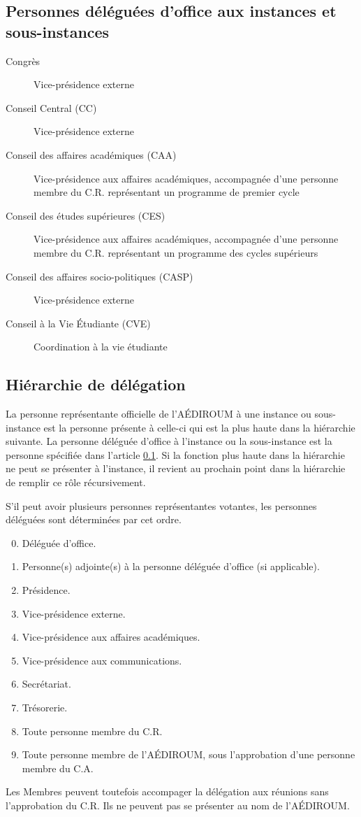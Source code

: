 \documentclass{aediroum}
\newcommand{\article}[1]{article \ref{#1}}
\begin{document}
\subsection{Personnes déléguées d’office aux instances et sous-instances}\label{sec:delegues-doffice-instances}
\begin{description}
\item[Congrès] Vice-présidence externe
\item[Conseil Central (CC)] Vice-présidence externe
\item[Conseil des affaires académiques (CAA)] Vice-présidence aux affaires académiques, accompagnée d’une personne membre du C.R. représentant
un programme de premier cycle
\item[Conseil des études supérieures (CES)] Vice-présidence aux affaires académiques, accompagnée
d’une personne membre du C.R. représentant un programme des cycles supérieurs
\item[Conseil des affaires socio-politiques (CASP)] Vice-présidence externe
\item[Conseil à la Vie Étudiante (CVE)] Coordination à la vie étudiante
\end{description}

\subsection{Hiérarchie de délégation}\label{sec:hierarchie-delegues-faecum}

La personne représentante officielle de l'AÉDIROUM à une instance ou sous-instance est la personne présente à celle-ci qui est la plus haute dans la hiérarchie suivante. La personne déléguée d'office à l'instance ou la sous-instance est la personne spécifiée dans l'\article{sec:delegues-doffice-instances}. Si la fonction plus haute dans la hiérarchie ne peut se présenter à l'instance, il revient au prochain point dans la hiérarchie de remplir ce rôle récursivement.

S'il peut avoir plusieurs personnes représentantes votantes, les personnes déléguées sont déterminées par cet ordre.

\begin{enumerate}\setcounter{enumi}{-1}
\item Déléguée d'office.
\item Personne(s) adjointe(s) à la personne déléguée d’office (si applicable).
\item Présidence.
\item Vice-présidence externe.
\item Vice-présidence aux affaires académiques.
\item Vice-présidence aux communications.
\item Secrétariat.
\item Trésorerie.
\item Toute personne membre du C.R.
\item Toute personne membre de l'AÉDIROUM, sous l'approbation d'une personne membre du C.A.
\end{enumerate}

Les Membres peuvent toutefois accompager la délégation aux réunions sans l'approbation du C.R. Ils ne peuvent pas se présenter au nom de l'AÉDIROUM.
\end{document}

